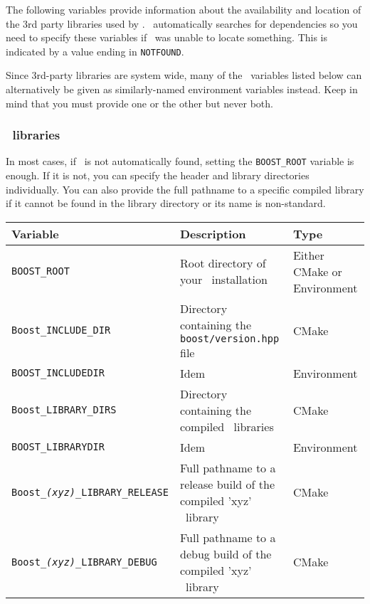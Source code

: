 The following variables provide information about the availability and
location of the 3rd party libraries used by \cgal. \cmake\ automatically
searches for dependencies so you need to specify these variables if \cmake\
was unable to locate something. This is indicated by a value ending in
\texttt{NOTFOUND}.

Since 3rd-party libraries are system wide, many of the \cmake\ variables listed below can alternatively
be given as similarly-named environment variables instead. Keep in mind that you must provide one or the
other but never both.

\subsubsection{\boost\ libraries}

In most cases, if \boost\ is not automatically found, setting the \texttt{BOOST\_ROOT} 
variable is enough. If it is not, you can specify the header and library
directories individually. You can also provide the full pathname to a specific compiled library
if it cannot be found in the library directory or its name is non-standard.

{\ccTexHtml{\small}{}
\renewcommand{\arraystretch}{1.3}
\gdef\lcTabularBorder{2}
\begin{tabular}{|l|l|l|} \hline
  \textbf{Variable}                             & \textbf{Description}                                                 & \textbf{Type}\\\hline\hline
  \texttt{BOOST\_ROOT}\footnotemark[16]         & Root directory of your \boost\ installation                            & Either CMake or Environment\\\hline
  \texttt{Boost\_INCLUDE\_DIR}                  & Directory containing the \texttt{boost/version.hpp} file             & CMake\\\hline
  \texttt{BOOST\_INCLUDEDIR}                    & Idem                                                                 & Environment\\\hline
  \texttt{Boost\_LIBRARY\_DIRS}                 & Directory containing the compiled \boost\ libraries                    & CMake\\\hline
  \texttt{BOOST\_LIBRARYDIR}                    & Idem                                                                 & Environment\\\hline
  \texttt{Boost\_{\em (xyz)}\_LIBRARY\_RELEASE} & Full pathname to a release build of the compiled 'xyz' \boost\ library & CMake\\\hline
  \texttt{Boost\_{\em (xyz)}\_LIBRARY\_DEBUG}   & Full pathname to a debug build of the compiled 'xyz' \boost\ library   & CMake\\\hline
\end{tabular}
}
\addtocounter{footnote}{1}

